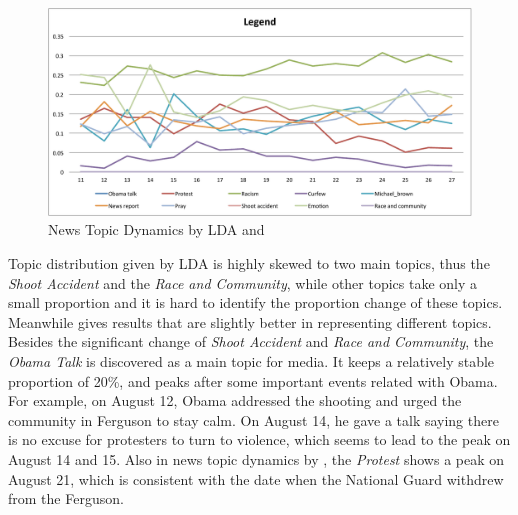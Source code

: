 \begin{figure}[htpb]
\centering
{}
\includegraphics[width=\linewidth]{figures/Legend.pdf}
\caption{News Topic Dynamics by LDA and \stlda}\label{fig:news_topics}
\end{figure}

Topic distribution given by LDA is highly skewed to two main topics, thus the \emph{Shoot Accident} and the \emph{Race and Community}, while other topics take only a small proportion and it is hard to identify the proportion change of these topics. Meanwhile \stlda gives results that are slightly better in representing different topics. Besides the significant change of \emph{Shoot Accident} and \emph{Race and Community}, the \emph{Obama Talk} is discovered as a main topic for media. It keeps a relatively stable proportion of 20\%, and peaks after some important events related with Obama. For example, on August 12, Obama addressed the shooting and urged the community in Ferguson to stay calm. On August 14, he gave a talk saying there is no excuse for protesters to turn to violence, which seems to lead to the peak on August 14 and 15. Also in news topic dynamics by \stlda, the \emph{Protest} shows a peak on August 21, which is consistent with the date when the National Guard withdrew from the Ferguson.

